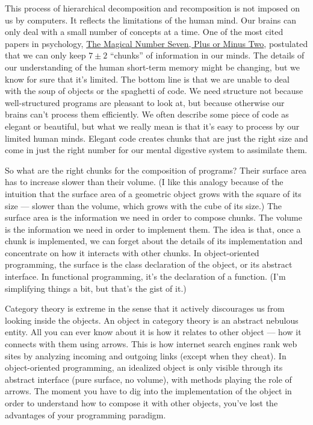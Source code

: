 This process of hierarchical decomposition and recomposition is not
imposed on us by computers. It reflects the limitations of the human
mind. Our brains can only deal with a small number of concepts at a
time. One of the most cited papers in psychology,
\href{http://en.wikipedia.org/wiki/The_Magical_Number_Seven,_Plus_or_Minus_Two}{The
Magical Number Seven, Plus or Minus Two}, postulated that we can only
keep \ensuremath{7 \pm 2} ``chunks'' of information in our minds. The details of our
understanding of the human short-term memory might be changing, but we
know for sure that it's limited. The bottom line is that we are unable
to deal with the soup of objects or the spaghetti of code. We need
structure not because well-structured programs are pleasant to look at,
but because otherwise our brains can't process them efficiently. We
often describe some piece of code as elegant or beautiful, but what we
really mean is that it's easy to process by our limited human minds.
Elegant code creates chunks that are just the right size and come in
just the right number for our mental digestive system to assimilate
them.

So what are the right chunks for the composition of programs? Their
surface area has to increase slower than their volume. (I like this
analogy because of the intuition that the surface area of a geometric
object grows with the square of its size --- slower than the volume,
which grows with the cube of its size.) The surface area is the
information we need in order to compose chunks. The volume is the
information we need in order to implement them. The idea is that, once a
chunk is implemented, we can forget about the details of its
implementation and concentrate on how it interacts with other chunks. In
object-oriented programming, the surface is the class declaration of the
object, or its abstract interface. In functional programming, it's the
declaration of a function. (I'm simplifying things a bit, but that's the
gist of it.)

Category theory is extreme in the sense that it actively discourages us
from looking inside the objects. An object in category theory is an
abstract nebulous entity. All you can ever know about it is how it
relates to other object --- how it connects with them using arrows. This
is how internet search engines rank web sites by analyzing incoming and
outgoing links (except when they cheat). In object-oriented programming,
an idealized object is only visible through its abstract interface (pure
surface, no volume), with methods playing the role of arrows. The moment
you have to dig into the implementation of the object in order to
understand how to compose it with other objects, you've lost the
advantages of your programming paradigm.


